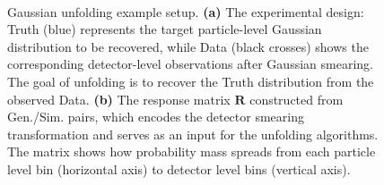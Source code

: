 \begin{figure}
    \centering
     \\
    \caption[Gaussian example setup]{Gaussian unfolding example setup. 
    \textbf{(a)} The experimental design: Truth (blue) represents the target particle-level Gaussian distribution to be recovered, while Data (black crosses) shows the corresponding detector-level observations after Gaussian smearing. 
    The goal of unfolding is to recover the Truth distribution from the observed Data.
    \textbf{(b)} The response matrix $\mathbf{R}$ constructed from Gen./Sim. pairs, which encodes the detector smearing transformation and serves as an input for the unfolding algorithms.
    The matrix shows how probability mass spreads from each particle level bin (horizontal axis) to detector level bins (vertical axis).\footnotemark
    }
    \label{fig:gaus_init}
\end{figure}
